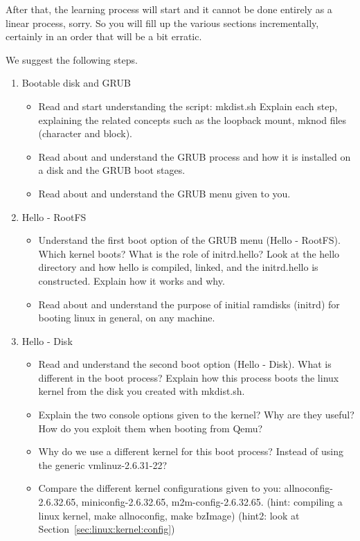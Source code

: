 \documentclass[10]{article}
\begin{document}
After that, the learning process will start and it cannot be done entirely 
as a linear process, sorry. So you will fill up the various sections
incrementally, certainly in an order that will be a bit erratic.

We suggest the following steps.

\begin{enumerate}
\item Bootable disk and GRUB
\begin{itemize}
\item Read and start understanding the script: mkdist.sh
Explain each step, explaining the related concepts such as 
the loopback mount, mknod files (character and block).
\item Read about and understand the GRUB process and how it is
installed on a disk and the GRUB boot stages.
\item Read about and understand the GRUB menu given to you.
\end{itemize}

\item Hello - RootFS
\begin{itemize}
\item Understand the first boot option of the GRUB menu (Hello - RootFS).
Which kernel boots? What is the role of initrd.hello? Look at the
hello directory and how hello is compiled, linked, and the initrd.hello
is constructed. Explain how it works and why.
\item Read about and understand the purpose of initial ramdisks (initrd)
for booting linux in general, on any machine.
\end{itemize}

\item Hello - Disk
\begin{itemize}
\item Read and understand the second boot option (Hello - Disk).
What is different in the boot process? Explain how this process
boots the linux kernel from the disk you created with mkdist.sh.
\item Explain the two console options given to the kernel?
Why are they useful? How do you exploit them when booting from Qemu?
\item Why do we use a different kernel for this boot process?
Instead of using the generic vmlinuz-2.6.31-22?
\item Compare the different kernel configurations given to you:
allnoconfig-2.6.32.65, miniconfig-2.6.32.65, m2m-config-2.6.32.65.
(hint: compiling a linux kernel, make allnoconfig, make bzImage)
(hint2: look at Section~\ref{sec:linux:kernel:config})


\end{itemize}
\end{enumerate}
\end{document}
